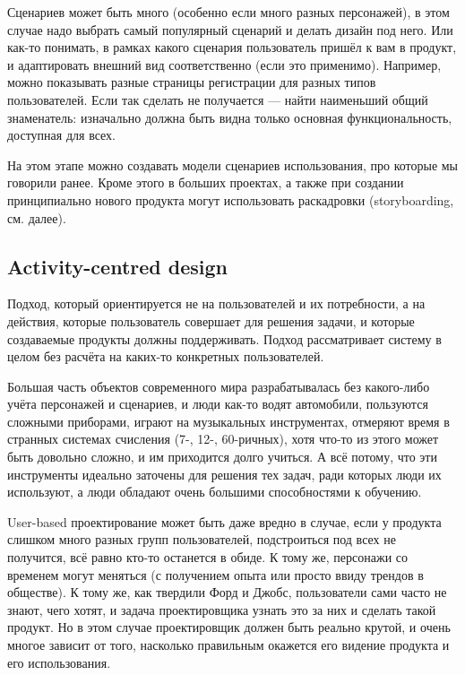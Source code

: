 \documentclass{../../text-style}
\begin{document}
Сценариев может быть много (особенно если много разных персонажей), в этом случае надо выбрать самый популярный сценарий и делать дизайн под него. Или как-то понимать, в рамках какого сценария пользователь пришёл к вам в продукт, и адаптировать внешний вид соответственно (если это применимо). Например, можно показывать разные страницы регистрации для разных типов пользователей. Если так сделать не получается --- найти наименьший общий знаменатель: изначально должна быть видна только основная функциональность, доступная для всех.

На этом этапе можно создавать модели сценариев использования, про которые мы говорили ранее. Кроме этого в больших проектах, а также при создании принципиально нового продукта могут использовать раскадровки (storyboarding, см. далее).

\subsection{Activity-centred design}

Подход, который ориентируется не на пользователей и их потребности, а на действия, которые пользователь совершает для решения задачи, и которые создаваемые продукты должны поддерживать. Подход рассматривает систему в целом без расчёта на каких-то конкретных пользователей.

Большая часть объектов современного мира разрабатывалась без какого-либо учёта персонажей и сценариев, и люди как-то водят автомобили, пользуются сложными приборами, играют на музыкальных инструментах, отмеряют время в странных системах счисления (7-, 12-, 60-ричных), хотя что-то из этого может быть довольно сложно, и им приходится долго учиться. А всё потому, что эти инструменты идеально заточены для решения тех задач, ради которых люди их используют, а люди обладают очень большими способностями к обучению. 

User-based проектирование может быть даже вредно в случае, если у продукта слишком много разных групп пользователей, подстроиться под всех не получится, всё равно кто-то останется в обиде. К тому же, персонажи со временем могут меняться (с получением опыта или просто ввиду трендов в обществе). К тому же, как твердили Форд и Джобс, пользователи сами часто не знают, чего хотят, и задача проектировщика узнать это за них и сделать такой продукт. Но в этом случае проектировщик должен быть реально крутой, и очень многое зависит от того, насколько правильным окажется его видение продукта и его использования.
\end{document}
